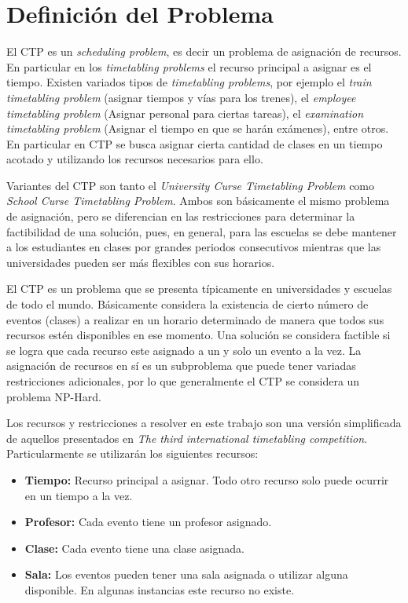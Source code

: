 \documentclass[letter, 10pt]{article}
\renewcommand{\bf}[1]{\textbf{#1}}
\begin{document}
\section{Definición del Problema}\label{sec:def}
El CTP es un \emph{scheduling problem}, es decir un problema de asignación de
recursos.
En particular en los \emph{timetabling problems} el recurso principal a asignar
es el tiempo. 
Existen variados tipos de \emph{timetabling problems}, por ejemplo el
\emph{train timetabling problem}\cite{caprara2002modeling,khan2010stochastic}
(asignar tiempos y vías para los trenes), el \emph{employee timetabling
problem}\cite{detienne2009cut,cowling2000hyperheuristic} (Asignar personal para 
ciertas tareas), el \emph{examination timetabling problem}\cite{di2000tabu}
(Asignar el tiempo en que se harán exámenes), entre otros.
En particular en CTP se busca asignar cierta cantidad de clases en un tiempo
acotado y utilizando los recursos necesarios para ello.

Variantes del CTP son tanto  el \emph{University Curse Timetabling  Problem}
como \emph{School Curse Timetabling Problem}. Ambos son básicamente el
mismo problema de asignación, pero se diferencian en las restricciones para
determinar la factibilidad de una solución, pues, en general, para las escuelas
se debe mantener a los estudiantes en clases por grandes periodos consecutivos
mientras que las universidades pueden ser más flexibles con sus horarios.

El CTP es un problema que se presenta típicamente en universidades y escuelas
de todo el mundo. Básicamente considera la existencia de cierto número de
eventos (clases) a realizar en un horario determinado de manera que todos sus
recursos estén disponibles en ese momento.
Una solución se considera factible si se logra que cada recurso este asignado
a un y solo un evento a la vez. La asignación de recursos en sí es un
subproblema que puede tener variadas restricciones adicionales, por lo que
generalmente el CTP se considera un problema NP-Hard.

Los recursos y restricciones a resolver en este trabajo son una versión
simplificada de aquellos presentados en \emph{The third international
timetabling competition}\cite{post2016third}. Particularmente se utilizarán
los siguientes recursos:
\begin{itemize}
  \item \bf{Tiempo:}
    Recurso principal a asignar. Todo otro recurso solo puede ocurrir en un
    tiempo a la vez.
  \item \bf{Profesor:}
    Cada evento tiene un profesor asignado.
  \item \bf{Clase:}
    Cada evento tiene una clase asignada.
  \item \bf{Sala:}
    Los eventos pueden tener una sala asignada o utilizar alguna disponible. En
    algunas instancias este recurso no existe.
\end{itemize}
\end{document}
